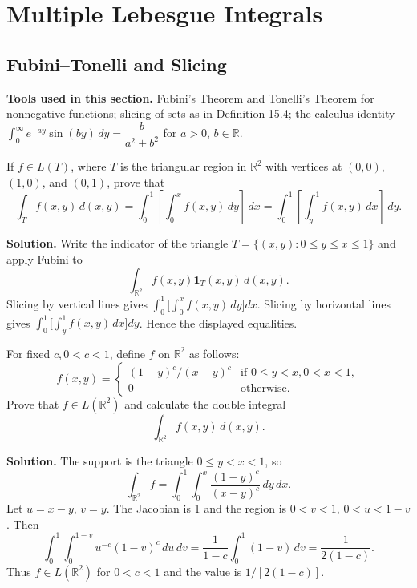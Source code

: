 \chapter{Multiple Lebesgue Integrals}


\section{Fubini--Tonelli and Slicing}
\noindent\textbf{Tools used in this section.} Fubini's Theorem and Tonelli's Theorem for nonnegative functions; slicing of sets as in Definition 15.4; the calculus identity \(\int_0^{\infty} e^{-ay} \sin(by) \, dy = \dfrac{b}{a^2 + b^2}\) for \(a>0\), \(b\in\mathbb{R}\).
 
\begin{problembox}
If \( f \in L(T) \), where \( T \) is the triangular region in \( \mathbb{R}^2 \) with vertices at \((0, 0)\), \((1, 0)\), and \((0, 1)\), prove that
\[
\int_T f(x, y) \, d(x, y) = \int_0^1 \left[ \int_0^x f(x, y) \, dy \right] \, dx = \int_0^1 \left[ \int_y^1 f(x, y) \, dx \right] \, dy.
\]
\end{problembox}

\noindent\textbf{Solution.}
Write the indicator of the triangle \(T=\{(x,y): 0\le y \le x \le 1\}\) and apply Fubini to
\[
\int_{\mathbb{R}^2} f(x,y) \mathbf{1}_T(x,y)\, d(x,y).
\]
Slicing by vertical lines gives \(\int_0^1\!\big[\int_0^x f(x,y)\,dy\big]dx\). Slicing by horizontal lines gives \(\int_0^1\!\big[\int_y^1 f(x,y)\,dx\big]dy\). Hence the displayed equalities.

\begin{problembox}
For fixed \( c, 0 < c < 1 \), define \( f \) on \( \mathbb{R}^2 \) as follows:
\[
f(x, y) = 
\begin{cases} 
(1 - y)^c / (x - y)^c & \text{if } 0 \leq y < x, 0 < x < 1, \\
0 & \text{otherwise}.
\end{cases}
\]
Prove that \( f \in L(\mathbb{R}^2) \) and calculate the double integral 
\[
\int_{\mathbb{R}^2} f(x, y) \, d(x, y).
\]
\end{problembox}

\noindent\textbf{Solution.}
The support is the triangle \(0\le y < x < 1\), so
\[
\int_{\mathbb{R}^2} f = \int_0^1\!\int_0^x \frac{(1-y)^c}{(x-y)^c}\,dy\,dx.
\]
Let \(u=x-y\), \(v=y\). The Jacobian is 1 and the region is \(0<v<1\), \(0<u<1-v\). Then
\[
\int_0^1\!\int_0^{1-v} u^{-c}(1-v)^c\,du\,dv
= \frac{1}{1-c}\int_0^1 (1-v)\,dv = \frac{1}{2(1-c)}.
\]
Thus \(f\in L(\mathbb{R}^2)\) for \(0<c<1\) and the value is \(1/[2(1-c)]\).

